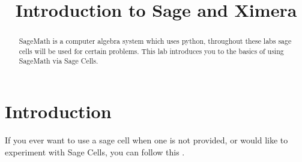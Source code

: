 \documentclass{ximera}
\title{Introduction to Sage and Ximera}
\begin{document}
\begin{abstract}
SageMath is a computer algebra system which uses python, throughout these labs sage cells will be used for certain problems. This lab introduces you to the basics of using SageMath via Sage Cells.
\end{abstract}
\maketitle
\section{Introduction}
If you ever want to use a sage cell when one is not provided, or would like to experiment with Sage Cells, you can follow this .
\end{document}
